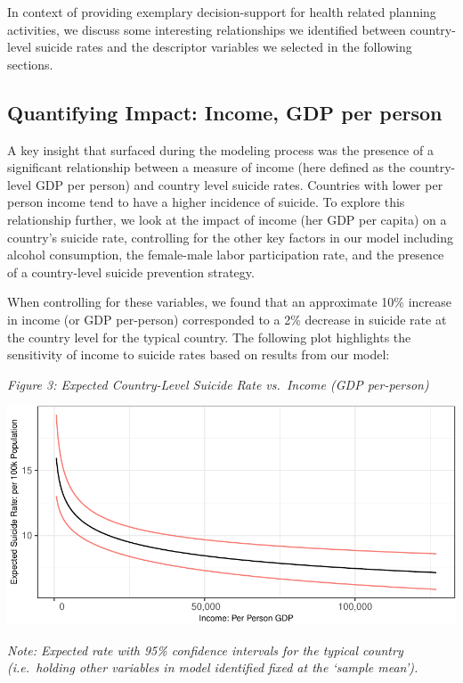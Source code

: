 \documentclass[]{article}
\begin{document}
In context of providing exemplary decision-support for health related
planning activities, we discuss some interesting relationships we
identified between country-level suicide rates and the descriptor
variables we selected in the following sections.

\subsection{Quantifying Impact: Income, GDP per
person}\label{quantifying-impact-income-gdp-per-person}

A key insight that surfaced during the modeling process was the presence
of a significant relationship between a measure of income (here defined
as the country-level GDP per person) and country level suicide rates.
Countries with lower per person income tend to have a higher incidence
of suicide. To explore this relationship further, we look at the impact
of income (her GDP per capita) on a country's suicide rate, controlling
for the other key factors in our model including alcohol consumption,
the female-male labor participation rate, and the presence of a
country-level suicide prevention strategy.

When controlling for these variables, we found that an approximate 10\%
increase in income (or GDP per-person) corresponded to a 2\% decrease in
suicide rate at the country level for the typical country. The following
plot highlights the sensitivity of income to suicide rates based on
results from our model:

\emph{Figure 3: Expected Country-Level Suicide Rate vs.~Income (GDP
per-person)}

\begin{center}\includegraphics{Project_Report_files/figure-latex/agdp_plot-1} \end{center}

\emph{Note: Expected rate with 95\% confidence intervals for the typical
country (i.e.~holding other variables in model identified fixed at the
`sample mean').}
\end{document}
